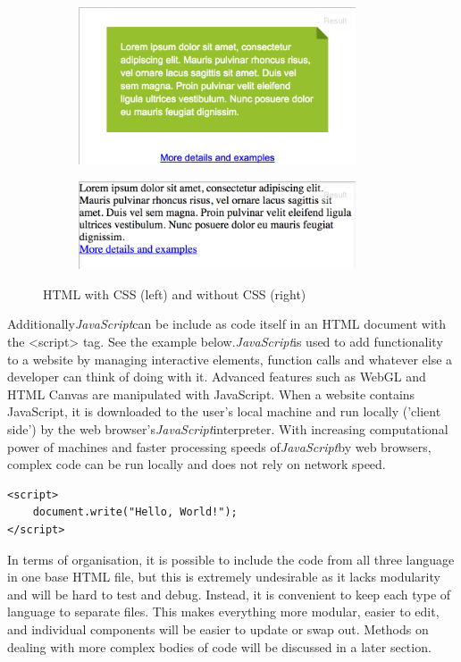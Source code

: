 \documentclass[a4paper,11pt,twoside]{article}
\begin{document}
\begin{figure}
\centering
\begin{subfigure}{.5\textwidth}
  \centering
  \includegraphics[width=82mm]{graphics/css_01.png}

  \label{fig:sub1}
\end{subfigure}%
\begin{subfigure}{.5\textwidth}
  \centering
  \includegraphics[width=82mm]{graphics/css_02.png}

  \label{fig:sub2}
\end{subfigure}
\caption{HTML with CSS (left) and without CSS (right)}

\end{figure}


Additionally\textit{JavaScript}can be include as code itself in an HTML document with the <script> tag. See the example below.\textit{JavaScript}is used to add functionality to a website by managing interactive elements, function calls and whatever else a developer can think of doing with it. Advanced features such as WebGL and HTML Canvas are manipulated with JavaScript. When a website contains JavaScript, it is downloaded to the user's local machine and run locally ('client side') by the web browser's\textit{JavaScript}interpreter. With increasing computational power of machines and faster processing speeds of\textit{JavaScript}by web browsers, complex code can be run locally and does not rely on network speed.



\begin{verbatim}
<script>
    document.write("Hello, World!");
</script>
\end{verbatim}


In terms of organisation, it is possible to include the code from all three language in one base HTML file, but this is extremely undesirable as it lacks modularity and will be hard to test and debug. Instead, it is convenient to keep each type of language to separate files. This makes everything more modular, easier to edit, and individual components will be easier to update or swap out. Methods on dealing with more complex bodies of code will be discussed in a later section.
\end{document}
